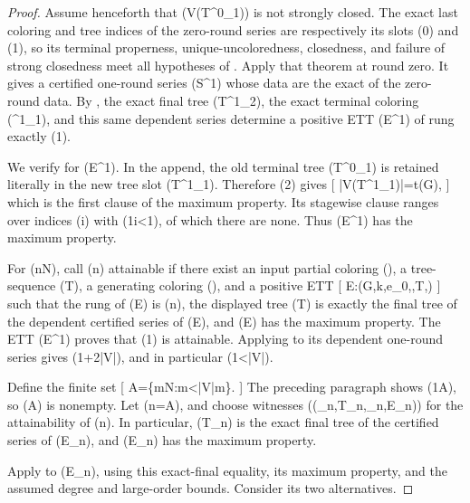 \begin{proof}
Assume henceforth that (V(T^0_1)) is not strongly closed.  The exact
last coloring and tree indices of the zero-round series are respectively
its slots (0) and (1), so its terminal properness, unique-uncoloredness,
closedness, and failure of strong closedness meet all hypotheses of
.  Apply that theorem at round zero.
It gives a certified one-round series (\mathcal S^1) whose data are the
exact  of the zero-round data.  By
, the exact final tree (T^1_2),
the exact terminal coloring (\varphi^1_1), and this same dependent
series determine a positive ETT (\mathcal E^1) of rung exactly (1).

We verify  for (\mathcal E^1).  In the append,
the old terminal tree (T^0_1) is retained literally in the new tree slot
(T^1_1).  Therefore (2) gives
[
                         |V(T^1_1)|=t(G),                     
]
which is the first clause of the maximum property.  Its stagewise clause
ranges over indices (i) with (1\leq i<1), of which there are none.
Thus (\mathcal E^1) has the maximum property.

For (n\in\mathbb N), call (n) attainable if there exist an input
partial coloring (\rho), a tree-sequence (T), a generating coloring
(\sigma), and a positive ETT
[
                    \mathcal E:(G,k,e_0,\rho,T,\sigma)
]
such that the rung of (\mathcal E) is (n), the displayed tree (T)
is exactly the final tree of the dependent certified series of
(\mathcal E), and (\mathcal E) has the maximum property.  The ETT
(\mathcal E^1) proves that (1) is attainable.  Applying
 to its dependent one-round series
gives (1+2\leq |V|), and in particular (1<|V|).

Define the finite set
[
        A=\{m\in\mathbb N:m<|V|m\}.
]
The preceding paragraph shows (1\in A), so (A) is nonempty.  Let
(n=\max A), and choose witnesses
((\rho_n,T_n,\sigma_n,\mathcal E_n)) for the attainability of (n).
In particular, (T_n) is the exact final tree of the certified series of
(\mathcal E_n), and (\mathcal E_n) has the maximum property.

Apply  to (\mathcal E_n), using this
exact-final equality, its maximum property, and the assumed degree and
large-order bounds.  Consider its two alternatives.


\end{proof}
